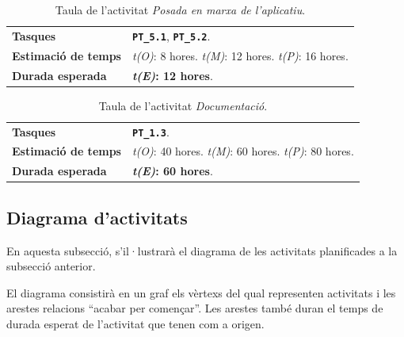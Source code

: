\documentclass[a4paper,12pt]{ThesisStyle}
\begin{document}
\begin{table}[H]
  \begin{tabularx}{\textwidth}{l | X}
    \toprule
    \rowcolor{Purple}
    \multicolumn{2}{c}{\texttt{\textbf{A20:}} Posada en marxa de l'aplicatiu}\\
    \midrule[0.9pt]
    \textbf{Tasques}                 & \texttt{\textbf{PT\_5.1}}, \texttt{\textbf{PT\_5.2}}.\\
    \midrule
    \textbf{Estimació de temps}      & \textit{t(O)}: 8 hores.
    \newline \textit{t(M)}: 12 hores.
    \newline \textit{t(P)}: 16 hores.\\
    \midrule
    \textbf{Durada esperada}         & \textbf{\textit{t(E)}: 12 hores}.\\
    \bottomrule
  \end{tabularx}
  \caption{\label{taula:a20} Taula de l'activitat \emph{Posada en marxa de l'aplicatiu}.}
\end{table}

\begin{table}[H]
  \begin{tabularx}{\textwidth}{l | X}
    \toprule
    \rowcolor{Gray}
    \multicolumn{2}{c}{\texttt{\textbf{A21:}} Documentació}\\
    \midrule[0.9pt]
    \textbf{Tasques}                 & \texttt{\textbf{PT\_1.3}}.\\
    \midrule
    \textbf{Estimació de temps}      & \textit{t(O)}: 40 hores.
    \newline \textit{t(M)}: 60 hores.
    \newline \textit{t(P)}: 80 hores.\\
    \midrule
    \textbf{Durada esperada}         & \textbf{\textit{t(E)}: 60 hores}.\\
    \bottomrule
  \end{tabularx}
  \caption{\label{taula:a21} Taula de l'activitat \emph{Documentació}.}
\end{table}

\subsection{Diagrama d'activitats}
\label{subsec:diagrama_activitats}

En aquesta subsecció, s'il·lustrarà el diagrama de les activitats planificades a la subsecció anterior.

El diagrama consistirà en un graf els vèrtexs del qual representen activitats i les arestes relacions ``acabar per començar''. Les arestes també duran el temps de durada esperat de l'activitat que tenen com a origen.
\end{document}

